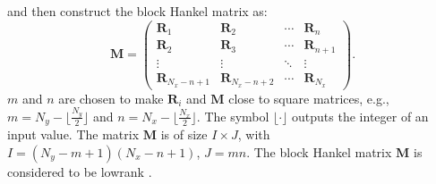 and then construct the block Hankel matrix as:
\begin{equation}
\label{eq:hankel2}
\mathbf{M}=\left(\begin{array}{cccc}
\mathbf{R}_1 &\mathbf{R}_2 & \cdots &\mathbf{R}_n \\
\mathbf{R}_2 &\mathbf{R}_3 &\cdots &\mathbf{R}_{n+1} \\
\vdots & \vdots &\ddots &\vdots \\
\mathbf{R}_{N_x-n+1}&\mathbf{R}_{N_x-n+2} &\cdots&\mathbf{R}_{N_x}
\end{array}
\right).
\end{equation}
 $m$ and $n$ are chosen to make $\mathbf{R}_i$ and $\mathbf{M}$ close to square matrices, e.g., $m=N_y-\lfloor\frac{N_y}{2}\rfloor$ and $n=N_x-\lfloor\frac{N_x}{2}\rfloor$. The symbol $\lfloor\cdot \rfloor$ outputs the integer of an input value. The matrix $\mathbf{M}$ is of size $I\times J$, with $I=(N_y-m+1)(N_x-n+1)$, $J=mn$. The block Hankel matrix $\mathbf{M}$ is considered to be lowrank \cite[]{trickett2008,mssa,weilin2016dmssa,yangkang2019nc}. 

